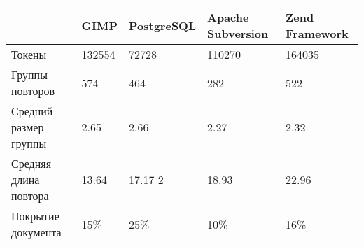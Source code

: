 \begin{minipage}{0.8\textwidth}
\begin{adjustbox}{center}
\begin{tabular}{|l||m{}|m{}|m{}|m{}|}
	\hline
	& GIMP & PostgreSQL & Apache Subversion & Zend Framework \\
	\hline
	\hline
	Токены & 132554  & 72728  & 110270  & 164035 \\
	\hline
	Группы повторов & 574  &464   &282   & 522  \\
	\hline
	Средний размер группы & 2.65 & 2.66& 2.27 &  2.32 \\
	\hline
	Средняя длина повтора & 13.64 &17.17 2 & 18.93 & 22.96 \\
	\hline
	Покрытие документа & 15\% & 25\% & 10\% & 16\% \\
	\hline
	
\end{tabular}
\end{adjustbox}
\end{minipage}